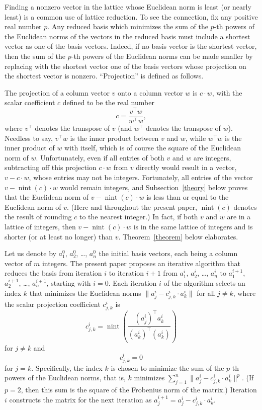 \documentclass{article}
\DeclareMathOperator{\nint}{nint}
\begin{document}
Finding a nonzero vector in the lattice whose Euclidean norm is least
(or nearly least) is a common use of lattice reduction. To see the connection,
fix any positive real number $p$.
Any reduced basis which minimizes the sum of the $p$-th powers
of the Euclidean norms of the vectors in the reduced basis
must include a shortest vector as one of the basis vectors.
Indeed, if no basis vector is the shortest vector,
then the sum of the $p$-th powers of the Euclidean norms
can be made smaller by replacing with the shortest vector
one of the basis vectors whose projection on the shortest vector is nonzero.
``Projection'' is defined as follows.

The projection of a column vector $v$ onto a column vector $w$ is $c \cdot w$,
with the scalar coefficient $c$ defined to be the real number
%
\begin{equation}
c = \frac{v^\top w}{w^\top w},
\end{equation}
%
where $v^\top$ denotes the transpose of $v$
(and $w^\top$ denotes the transpose of $w$).
Needless to say, $v^\top w$ is the inner product between $v$ and $w$,
while $w^\top w$ is the inner product of $w$ with itself, which is of course
the square of the Euclidean norm of $w$.
Unfortunately, even if all entries of both $v$ and $w$ are integers,
subtracting off this projection $c \cdot w$ from $v$ directly
would result in a vector, $v - c \cdot w$, whose entries may not be integers.
Fortunately, all entries of the vector $v - \nint(c) \cdot w$
would remain integers, and Subsection~\ref{theory} below proves that
the Euclidean norm of $v - \nint(c) \cdot w$ is less than or equal to
the Euclidean norm of $v$. (Here and throughout the present paper,
$\nint(c)$ denotes the result of rounding $c$ to the nearest integer.)
In fact, if both $v$ and $w$ are in a lattice of integers,
then $v - \nint(c) \cdot w$ is in the same lattice of integers
and is shorter (or at least no longer) than $v$.
Theorem~\ref{theorem} below elaborates.

Let us denote by $a^0_1$, $a^0_2$, \dots, $a^0_n$ the initial basis vectors,
each being a column vector of $m$ integers.
The present paper proposes an iterative algorithm that reduces the basis
from iteration $i$ to iteration $i+1$ from $a^i_1$, $a^i_2$, \dots, $a^i_n$
to $a^{i+1}_1$, $a^{i+1}_2$, \dots, $a^{i+1}_n$, starting with $i=0$.
Each iteration $i$ of the algorithm selects an index $k$
that minimizes the Euclidean norms $\| a^i_j - c^i_{j,k} \cdot a^i_k \|$
for all $j \ne k$, where the scalar projection coefficient $c^i_{j,k}$ is
%
\begin{equation}
\label{rounded}
c^i_{j,k} = \nint\left( \frac{(a^i_j)^\top a^i_k}{(a^i_k)^\top (a^i_k)} \right)
\end{equation}
%
for $j \ne k$ and
%
\begin{equation}
c^i_{j,k} = 0
\end{equation}
%
for $j = k$.
Specifically, the index $k$ is chosen to minimize the sum of the $p$-th powers
of the Euclidean norms, that is, $k$ minimizes
$\sum_{j = 1}^n \| a^i_j - c^i_{j,k} \cdot a^i_k \|^p$.
(If $p = 2$, then this sum is the square of the Frobenius norm of the matrix.)
Iteration $i$ constructs the matrix for the next iteration as
$a^{i+1}_j = a^i_j - c^i_{j,k} \cdot a^i_k$.
\end{document}
